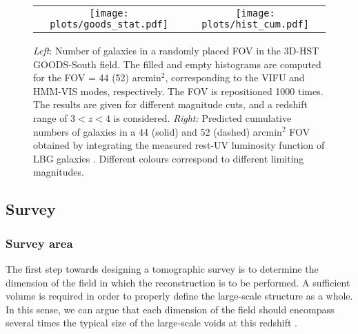 \documentclass{aa}
\begin{document}
\begin{figure*}
\begin{center}
\begin{tabular}{cc}
\texttt{[image: plots/goods\_stat.pdf]}&
\texttt{[image: plots/hist\_cum.pdf]}
\end{tabular}
\caption{{\it Left}: Number of galaxies in a randomly placed FOV in the 3D-HST GOODS-South field. The filled and empty histograms are computed for the FOV = 44 (52) arcmin$^2$, corresponding to the VIFU and HMM-VIS modes, respectively. The FOV is repositioned 1000 times. The results are given for different magnitude cuts, and a redshift range of $3 < z < 4$ is considered. {\it Right:} Predicted cumulative numbers of galaxies in a 44 (solid) and 52 (dashed) arcmin$^2$ FOV obtained by integrating the measured rest-UV luminosity function of LBG galaxies \citep{Reddy2009,Bouwens2015}. Different colours correspond to different limiting magnitudes.}
\label{fig13}
\end{center}
\end{figure*}

\subsection{Survey}
\label{survey}

\subsubsection{Survey area}
The first step towards designing a tomographic survey is to determine the dimension of the field in which the reconstruction is to be performed. A sufficient volume is required in order to properly define the large-scale structure as a whole. In this sense, we can argue that each dimension of the field should encompass several times the typical size of the large-scale voids at this redshift \citep[i.e. roughly between $\sim 10$ and $\sim 20$~Mpc in diameter for the largest ones, see e.g.][]{Arbabi02}. 
\end{document}
